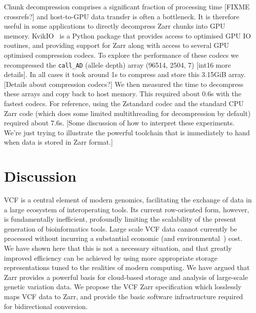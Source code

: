 \documentclass[a4paper,num-refs]{oup-contemporary}
\begin{document}
Chunk decompression comprises a significant fraction of processing
time [FIXME crossrefs?] and host-to-GPU data transfer is
often a bottleneck. It is therefore useful in some applications
to directly decompress Zarr chunks into GPU memory.
KvikIO~\cite{kvikio} is a Python package that provides access to optimised
GPU IO routines, and providing support for Zarr along with
access to several GPU optimised compression codecs.
To explore the performance of these codecs we recompressed
the \texttt{call\_AD} (allele depth) array
(96514, 2504, 7) [int16 more details]. In all cases it took around 1s
to compress and store this 3.15GiB array. [Details about compression codecs?]
We then measured the time to decompress these arrays and
copy back to host memory. This required about 0.6s with the
fastest codecs. For reference, using the Zstandard codec and the
standard CPU Zarr code (which does some limited multithreading for decompression
by default) required about 7.6s. [Some discussion of how to interpret
these experiments. We're just trying to illustrate the powerful toolchain
 that is immediately to hand when data is stored in Zarr format.]

\section{Discussion}
VCF is a central element of modern genomics, facilitating
the exchange of data in a large ecosystem of interoperating tools.
Its current row-oriented form, however,
is fundamentally inefficient,
profoundly limiting the scalability of the present generation
of bioinformatics tools. Large scale VCF data cannot
currently be
processed without incurring a substantial economic
(and environmental~\cite{grealey2022carbon}) cost.
We have shown here that this is not a necessary situation,
and that greatly improved efficiency can be achieved by
using more appropriate storage representations tuned
to the realities of modern computing. We have argued that
Zarr provides a powerful basis for cloud-based
storage and analysis of large-scale genetic variation data.
We propose the VCF Zarr specification which losslessly
maps VCF data to Zarr, and provide the basic software
infrastructure required for bidirectional conversion.
\end{document}
